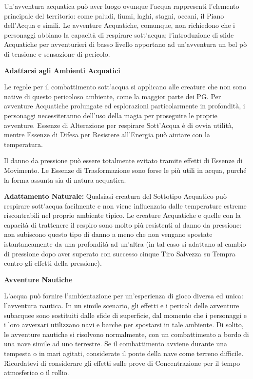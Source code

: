 \documentclass[a4paper,11pt,twoside,openany]{book}
\begin{document}
Un'avventura acquatica può aver luogo ovunque l'acqua rappresenti l'elemento principale del territorio: come paludi, fiumi, laghi, stagni, oceani, il Piano dell'Acqua e simili. Le avventure Acquatiche, comunque, non richiedono che i personaggi abbiano la capacità di respirare sott'acqua; l'introduzione di sfide Acquatiche per avventurieri di basso livello apportano ad un'avventura un bel pò di tensione e sensazione di pericolo.

\textbf{Adattarsi agli Ambienti Acquatici}

Le regole per il combattimento sott'acqua si applicano alle creature che non sono native di questo pericoloso ambiente, come la maggior parte dei PG. Per avventure Acquatiche prolungate ed esplorazioni particolarmente in profondità, i personaggi necessiteranno dell'uso della magia per proseguire le proprie avventure. Essenze di Alterazione per respirare Sott'Acqua è di ovvia utilità, mentre Essenze di Difesa per Resistere all'Energia può aiutare con la temperatura.

Il danno da pressione può essere totalmente evitato tramite effetti di Essenze di Movimento. Le Essenze di Trasformazione sono forse le più utili in acqua, purché la forma assunta sia di natura acquatica.

\textbf{Adattamento Naturale:} Qualsiasi creatura del Sottotipo Acquatico può respirare sott'acqua facilmente e non viene influenzata dalle temperature estreme riscontrabili nel proprio ambiente tipico. Le creature Acquatiche e quelle con la capacità di trattenere il respiro sono molto più resistenti al danno da pressione: non subiscono questo tipo di danno a meno che non vengano spostate istantaneamente da una profondità ad un'altra (in tal caso si adattano al cambio di pressione dopo aver superato con successo cinque Tiro Salvezza su Tempra contro gli effetti della pressione).

\textbf{Avventure Nautiche}

L'acqua può fornire l'ambientazione per un'esperienza di gioco diversa ed unica: l'avventura nautica. In un simile scenario, gli effetti e i pericoli delle avventure subacquee sono sostituiti dalle sfide di superficie, dal momento che i personaggi e i loro avversari utilizzano navi e barche per spostarsi in tale ambiente. Di solito, le avventure nautiche si risolvono normalmente, con un combattimento a bordo di una nave simile ad uno terrestre. Se il combattimento avviene durante una tempesta o in mari agitati, considerate il ponte della nave come terreno difficile. Ricordatevi di considerare gli effetti sulle prove di Concentrazione per il tempo atmosferico o il rollio.
\end{document}
